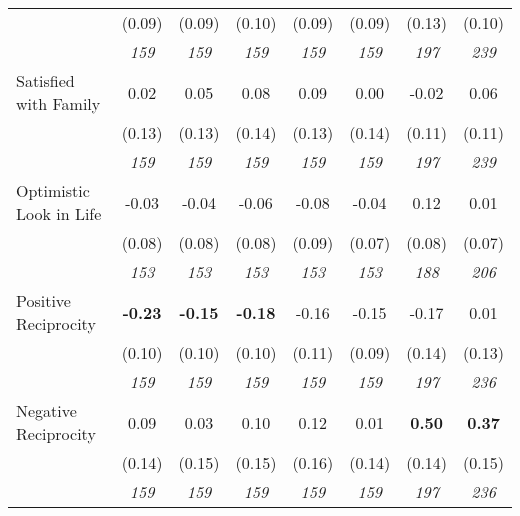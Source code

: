 \begin{tabular}{l c c c c c c c}
& (0.09) & (0.09) & (0.10) & (0.09) & (0.09) & (0.13) & (0.10) \\
& \textit{ 159 } & \textit{ 159 } & \textit{ 159 } & \textit{ 159 } & \textit{ 159 } & \textit{ 197 } & \textit{ 239 } \\
Satisfied with Family & 0.02 & 0.05 & 0.08 & 0.09 & 0.00 & -0.02 & 0.06 \\
& (0.13) & (0.13) & (0.14) & (0.13) & (0.14) & (0.11) & (0.11) \\
& \textit{ 159 } & \textit{ 159 } & \textit{ 159 } & \textit{ 159 } & \textit{ 159 } & \textit{ 197 } & \textit{ 239 } \\
Optimistic Look in Life & -0.03 & -0.04 & -0.06 & -0.08 & -0.04 & 0.12 & 0.01 \\
& (0.08) & (0.08) & (0.08) & (0.09) & (0.07) & (0.08) & (0.07) \\
& \textit{ 153 } & \textit{ 153 } & \textit{ 153 } & \textit{ 153 } & \textit{ 153 } & \textit{ 188 } & \textit{ 206 } \\
Positive Reciprocity & \textbf{ -0.23 } & \textbf{ -0.15 } & \textbf{ -0.18 } & -0.16 & -0.15 & -0.17 & 0.01 \\
& (0.10) & (0.10) & (0.10) & (0.11) & (0.09) & (0.14) & (0.13) \\
& \textit{ 159 } & \textit{ 159 } & \textit{ 159 } & \textit{ 159 } & \textit{ 159 } & \textit{ 197 } & \textit{ 236 } \\
Negative Reciprocity & 0.09 & 0.03 & 0.10 & 0.12 & 0.01 & \textbf{0.50} & \textbf{0.37} \\
& (0.14) & (0.15) & (0.15) & (0.16) & (0.14) & (0.14) & (0.15) \\
& \textit{ 159 } & \textit{ 159 } & \textit{ 159 } & \textit{ 159 } & \textit{ 159 } & \textit{ 197 } & \textit{ 236 } \\
\bottomrule
\end{tabular}

